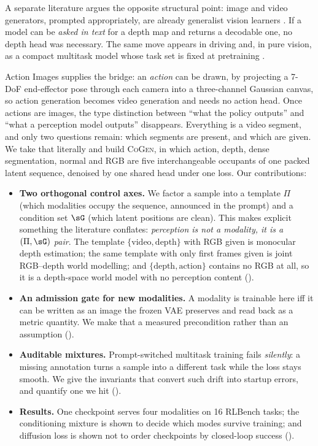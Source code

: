 \documentclass{article} %
\newcommand{\method}{\textsc{CoGen}}
\begin{document}
A separate literature argues the opposite structural point: image and video generators, prompted
appropriately, are already generalist vision learners \citep{gabeur2026image,wang2026video}. If a
model can be \emph{asked in text} for a depth map and returns a decodable one, no depth head was
necessary. The same move appears in driving \citep{yuan2026suv} and, in pure vision, as a compact
multitask model whose task set is fixed at pretraining \citep{zhuang2025argus}.

Action Images \citep{zhen2026action} supplies the bridge: an \emph{action} can be drawn, by
projecting a 7-DoF end-effector pose through each camera into a three-channel Gaussian canvas, so
action generation becomes video generation and needs no action head. Once actions are images, the
type distinction between ``what the policy outputs'' and ``what a perception model outputs''
disappears. Everything is a video segment, and only two questions remain: which segments are
present, and which are given. We take that literally and build \method, in which action, depth,
dense segmentation, normal and RGB are five interchangeable occupants of one packed latent
sequence, denoised by one shared head under one loss. Our contributions:

\begin{itemize}
\itemsep2pt
\item \textbf{Two orthogonal control axes.} We factor a sample into a template $\Pi$ (which
modalities occupy the sequence, announced in the prompt) and a condition set $\sG$ (which latent
positions are clean). This makes explicit something the literature conflates: \emph{perception is
not a modality, it is a $(\Pi,\sG)$ pair}. The template $\{\text{video},\text{depth}\}$ with RGB
given is monocular depth estimation; the same template with only first frames given is joint
RGB--depth world modelling; and $\{\text{depth},\text{action}\}$ contains no RGB at all, so it is
a depth-space world model with no perception content ().
\item \textbf{An admission gate for new modalities.} A modality is trainable here iff it can be
written as an image the frozen VAE preserves and read back as a metric quantity. We make that a
measured precondition rather than an assumption ().
\item \textbf{Auditable mixtures.} Prompt-switched multitask training fails \emph{silently}: a
missing annotation turns a sample into a different task while the loss stays smooth. We give the
invariants that convert such drift into startup errors, and quantify one we hit
().
\item \textbf{Results.} One checkpoint serves four modalities on 16 RLBench tasks; the
conditioning mixture is shown to decide which modes survive training; and diffusion loss is shown
not to order checkpoints by closed-loop success ().
\end{itemize}
\end{document}
